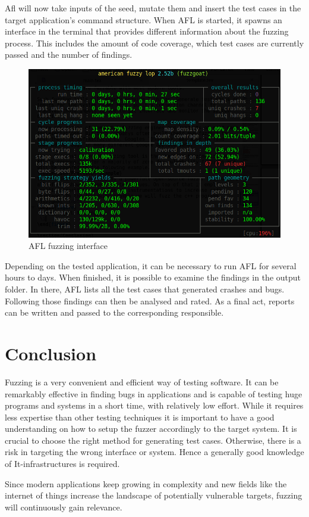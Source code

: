 \documentclass[journal=tosc,final]{iacrtrans}
\begin{document}
Afl will now take inputs of the seed, mutate them and insert the test cases in the target application’s command structure.
When AFL is started, it spawns an interface in the terminal that provides different information about the fuzzing process. This includes the amount of code coverage, which test cases are currently passed and the number of findings. 
\begin{figure}[h]
 \caption{AFL fuzzing interface}
 \begin{center}
   \includegraphics[scale=0.35]{afl.png}

 \end{center}
\end{figure}

Depending on the tested application, it can be necessary to run AFL for several hours to days. When finished, it is possible to examine the findings in the output folder. In there, AFL lists all the test cases that generated crashes and bugs. Following those findings can then be analysed and rated. As a final act, reports can be written and passed to the corresponding responsible.


\section{Conclusion}
Fuzzing is a very convenient and efficient way of testing software. It can be remarkably effective in finding bugs in applications and is capable of testing huge programs and systems in a short time, with relatively low effort. While it requires less expertise than other testing techniques it is important to have a good understanding on how to setup the fuzzer accordingly to the target system. It is crucial to choose the right method for generating test cases. Otherwise, there is a risk in targeting the wrong interface or system. Hence a generally good knowledge of It-infrastructures is required.

Since modern applications keep growing in complexity and new fields like the internet of things increase the landscape of potentially vulnerable targets, fuzzing will continuously gain relevance.
\newpage


\end{document}
